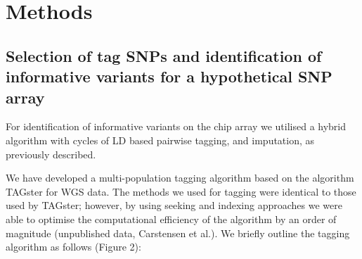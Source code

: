 \section{Methods}
\label{sec:methods_chip}

\subsection{Selection of tag SNPs and identification of informative variants for a hypothetical SNP array}


For identification of informative variants on the chip array we utilised a hybrid algorithm with cycles of LD based pairwise tagging, and imputation, as previously described.\cite{Hoffmann2011422}

We have developed a multi-population tagging algorithm based on the algorithm TAGster for WGS data.\cite{Xu2007} The methods we used for tagging were identical to those used by TAGster; however, by using seeking and indexing approaches we were able to optimise the computational efficiency of the algorithm by an order of magnitude (unpublished data, Carstensen et al.). We briefly outline the tagging algorithm as follows (Figure 2):

